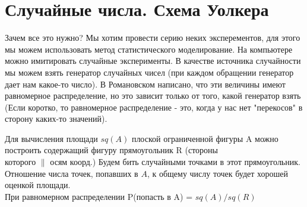 \documentclass[discrete.tex]{subfiles}
\begin{document}
\section{Случайные числа. Схема Уолкера}

\begin{remark}
    Зачем все это нужно? Мы хотим провести серию неких эксперементов, для этого мы можем 
    использовать метод статистического моделирование. На компьютере можно имитировать 
    случайные эксперименты. В качестве источника случайности мы можем взять генератор 
    случайных чисел (при каждом обращении генератор дает нам какое-то число).
    В Романовском написано, что эти величины имеют равномерное распределение, но это
    зависит только от того, какой генератор взять (Если коротко, то равномерное
    распределение - это, когда у нас нет "перекосов"  в сторону каких-то значений).
\end{remark}

\begin{example}
    Для вычисления площади $sq(A)$ плоской ограниченной фигуры A можно построить 
    содержащий фигуру прямоугольник R (стороны \\ которого $\parallel$ осям коорд.) 
    Будем бить случайными точками в этот прямоугольник. Отношение числа точек, попавших 
    в $A$, к общему числу точек будет хорошей оценкой площади.\\
    При равномерном распределении P(попасть в A) = $sq(A)/sq(R)$
\end{example}
\end{document}
